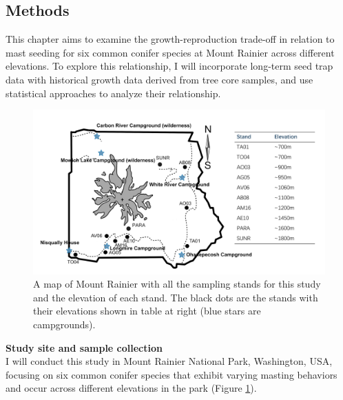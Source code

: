 \documentclass[11pt,letter]{article}
\begin{document}
\subsection{Methods}
This chapter aims to examine the growth-reproduction trade-off in relation to mast seeding for six common conifer species at Mount Rainier across different elevations. To explore this relationship, I will incorporate long-term seed trap data with historical growth data derived from tree core samples, and use statistical approaches to analyze their relationship.\par
\begin{figure}[htb]
	\centering
	\includegraphics[width=1\linewidth]{rainierMap.png}
	\caption{A map of Mount Rainier with all the sampling stands for this study and the elevation of each stand. The black dots are the stands with their elevations shown in table at right (blue stars are campgrounds).}
	\label{fig:sites}
\end{figure}
\textbf{Study site and sample collection}\\
I will conduct this study in Mount Rainier National Park, Washington, USA, focusing on six common conifer species that exhibit varying masting behaviors and occur across different elevations in the park (Figure \ref{fig:sites}).\par
\pagebreak
\end{document}
